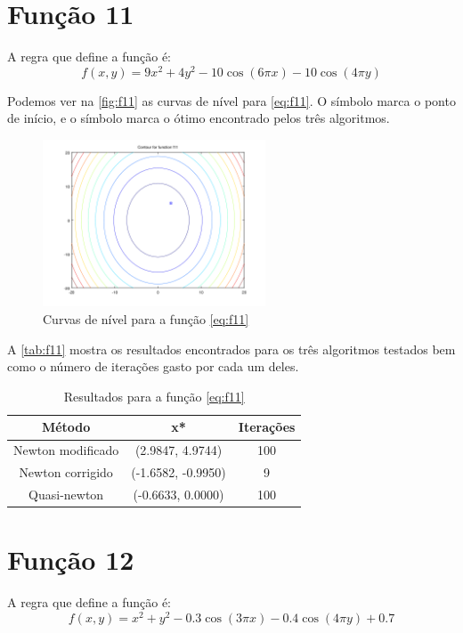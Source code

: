 \documentclass[12pt]{article}
\begin{document}
\section{Função 11}
A regra que define a função é:
\begin{equation}
\label{eq:f11}
f(x, y) = 9x^2 + 4y^2 - 10\cos(6\pi x) - 10\cos(4\pi y)
\end{equation}

Podemos ver na \autoref{fig:f11} as curvas de nível para \autoref{eq:f11}. O símbolo \textit{\textopenbullet} marca o ponto de início,
e o símbolo \textit{\texttimes} marca o ótimo encontrado pelos três algoritmos.

\begin{figure}[H]
  \centering
  \includegraphics[width=250px]{../matlab/images/f11_contour}
  \caption{Curvas de nível para a função \autoref{eq:f11}}
  \label{fig:f11}
\end{figure}

A \autoref{tab:f11} mostra os resultados encontrados para os três algoritmos testados bem como o número de iterações gasto por cada um deles.

\begin{table}[H]
\centering
\begin{tabular}{*3c}
\toprule
Método			&	x*		&	Iterações\\
\midrule
Newton modificado	&	(2.9847, 4.9744)	&	100\\
Newton corrigido	&	(-1.6582, -0.9950)	&	9\\
Quasi-newton		&	(-0.6633, 0.0000)	&	100\\
\bottomrule
\end{tabular}
\caption{\small{Resultados para a função \autoref{eq:f11} }}
\label{tab:f11}
\end{table}

\section{Função 12}
A regra que define a função é:
\begin{equation}
\label{eq:f12}
f(x, y) = x^2 + y^2 - 0.3\cos(3\pi x) - 0.4\cos(4\pi y) + 0.7
\end{equation}
\end{document}
